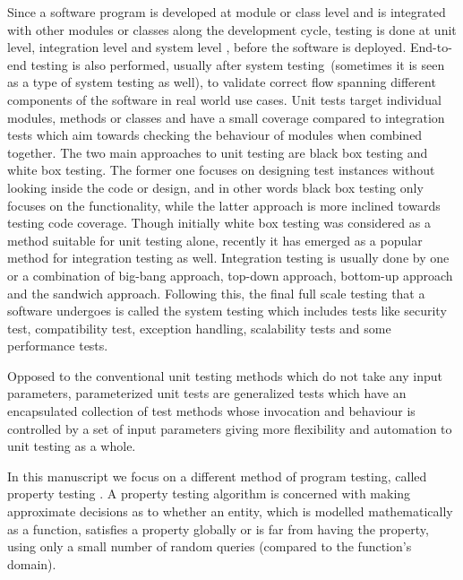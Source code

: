 Since a software program is developed at module or class level and is integrated with other modules or classes along the development cycle, testing is done at unit level, integration level and system level \cite{myers2011art}, before the software is deployed. End-to-end testing \cite{tsai2001end} is also performed, usually after system testing~(sometimes it is seen as a type of system testing as well), to validate correct flow spanning different components of the software in real world use cases. Unit tests target individual modules, methods or classes and have a small coverage compared to integration tests which aim towards checking the behaviour of modules when combined together. The two main approaches to unit testing are black box testing and white box testing. The former one focuses on designing test instances without looking inside the code or design, and in other words black box testing only focuses on the functionality, while the latter approach is more inclined towards testing code coverage.%
Though initially white box testing was considered as a method suitable for unit testing alone, recently it has emerged as a popular method for integration testing as well. Integration testing is usually done by one or a combination of big-bang approach, top-down approach, bottom-up approach and the sandwich approach. Following this, the final full scale testing that a software undergoes is called the system testing which includes tests like security test, compatibility test, exception handling, scalability tests and some performance tests. 

Opposed to the conventional unit testing methods which do not take any input parameters, parameterized unit tests \cite{tillmann2010parameterized} are generalized tests which have an encapsulated collection of test methods whose invocation and behaviour is controlled by a set of input parameters giving more flexibility and automation to unit testing as a whole. 

In this manuscript we focus on a different method of program testing, called property testing \cite{ron2001property}. A property testing algorithm is concerned with making approximate decisions as to whether an entity, which is modelled mathematically as a function, satisfies a property globally or is far from having the property, using only a small number of random queries (compared to the function's domain).
\nocite{holzmann1995improvement}
\nocite{zaki2008formal}

